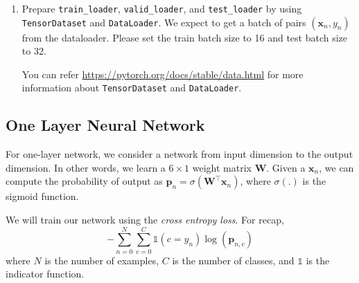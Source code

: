 \begin{enumerate}

\item {} 
Prepare \verb|train_loader|, \verb|valid_loader|, and \verb|test_loader| by using \verb|TensorDataset| and \verb|DataLoader|. We expect to get a batch of pairs $(\mathbf{x}_n, y_n)$ from the dataloader. Please set the train batch size to 16 and test batch size to 32.

You can refer \url{https://pytorch.org/docs/stable/data.html} for more information about \verb|TensorDataset| and \verb|DataLoader|. 

\end{enumerate}

\subsection{One Layer Neural Network }

For one-layer network, we consider a network from input dimension to the output dimension. In other words, we learn a $6 \times 1$ weight matrix $\mathbf{W}$. Given a $\mathbf{x}_n$, we can compute the probability of output as $\mathbf{p}_n = \sigma(\mathbf{W}^\top \mathbf{x}_n)$, where $\sigma(.)$ is the sigmoid function.

We will train our network using the \emph{cross entropy loss}. For recap,
$$
-\sum_{n=0}^{N} \sum_{c=0}^{C}  \mathds{1}(c=y_n) \log (\mathbf{p}_{n, c})
$$
where $N$ is the number of examples, $C$ is the number of classes, and $\mathds{1}$ is the indicator function.

